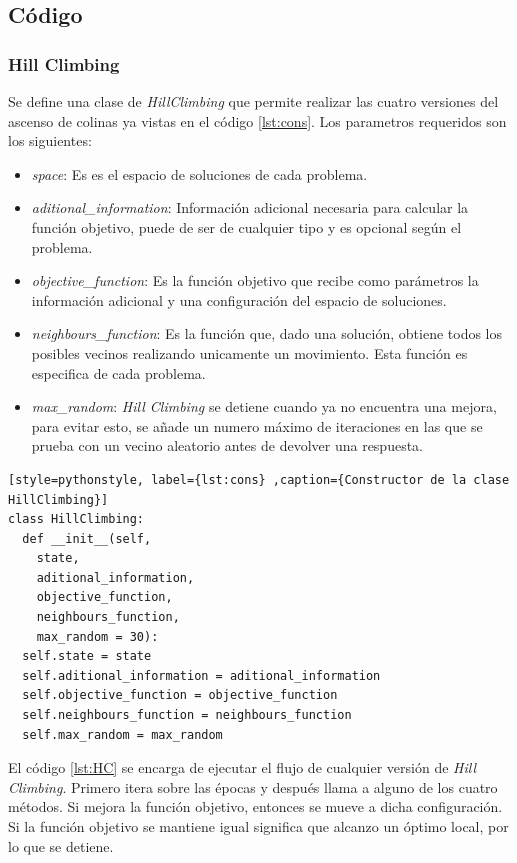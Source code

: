 \documentclass[12pt,twoside]{article}
\begin{document}
\clearpage
\subsection{Código}

\subsubsection{Hill Climbing}

Se define una clase de \textit{HillClimbing} que permite realizar las cuatro versiones del ascenso de colinas ya vistas en el código \ref{lst:cons}. Los parametros requeridos son los siguientes:
\begin{itemize}
	\item \textit{space}: Es es el espacio de soluciones de cada problema.
	\item \textit{aditional\_information}: Información adicional necesaria para calcular la función objetivo, puede de ser de cualquier tipo y es opcional según el problema.
	\item \textit{objective\_function}: Es la función objetivo que recibe como parámetros la información adicional y una configuración del espacio de soluciones.
	\item \textit{neighbours\_function}: Es la función que, dado una solución, obtiene todos los posibles vecinos realizando unicamente un movimiento. Esta función es especifica de cada problema.
	\item \textit{max\_random}: \textit{Hill Climbing} se detiene cuando ya no encuentra una mejora, para evitar esto, se añade un numero máximo de iteraciones en las que se prueba con un vecino aleatorio antes de devolver una respuesta. 
\end{itemize}

\begin{lstlisting}[style=pythonstyle, label={lst:cons} ,caption={Constructor de la clase HillClimbing}]
class HillClimbing:
  def __init__(self, 
    state, 
    aditional_information, 
    objective_function, 
    neighbours_function, 
    max_random = 30):
  self.state = state
  self.aditional_information = aditional_information
  self.objective_function = objective_function
  self.neighbours_function = neighbours_function
  self.max_random = max_random
\end{lstlisting}

El código \ref{lst:HC} se encarga de ejecutar el flujo de cualquier versión de \textit{Hill Climbing}. Primero itera sobre las épocas y después llama a alguno de los cuatro métodos. Si mejora la función objetivo, entonces se mueve a dicha configuración. Si la función objetivo se mantiene igual significa que alcanzo un óptimo local, por lo que se detiene.
\end{document}
